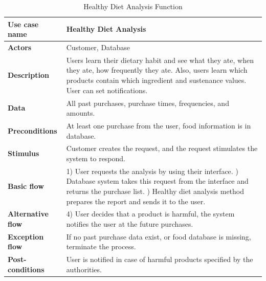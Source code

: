 \begin{table}[H]
    \centering
    \begin{tabular}{ | l | p{10cm} |}
    \hline
    \textbf{Use case name}    & Healthy Diet Analysis \\
    \hline
    \textbf{Actors}           & Customer, Database \\
    \hline
    \textbf{Description}      & Users learn their dietary habit and see what they ate, when they ate, how frequently they ate. Also, users learn which products contain which ingredient and sustenance values. User can set notifications.  \\
    \hline
    \textbf{Data}             & All past purchases, purchase times, frequencies, and amounts. \\
    \hline
    \textbf{Preconditions}    & At least one purchase from the user, food information is in database. \\
    \hline
    \textbf{Stimulus}         & Customer creates the request, and the request stimulates the system to respond. \\
    \hline
    \textbf{Basic flow}       & 1) User requests the analysis by using their interface. \newline 2) Database system takes this request from the interface and returns the purchase list. \newline 3) Healthy diet analysis method prepares the report and sends it to the user. \\
    \hline
    \textbf{Alternative flow} & 4) User decides that a product is harmful, the system notifies the user at the future purchases. \\
    \hline
    \textbf{Exception flow}   & If no past purchase data exist, or food database is missing, terminate the process. \\
    \hline
    \textbf{Post-conditions}  & User is notified in case of harmful products specified by the authorities. \\
    \hline
    \end{tabular}
    \label{tab:01healthy_diet_analysis}
    \caption{Healthy Diet Analysis Function}
\end{table}

